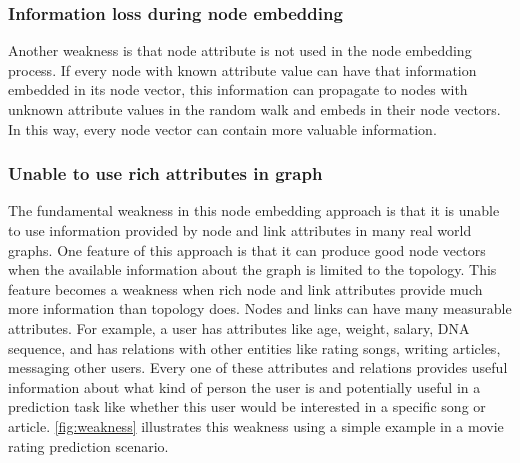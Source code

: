 \documentclass{article}
\begin{document}
\subsubsection{Information loss during node embedding}
Another weakness is that node attribute is not used in the node embedding process. If every node with known attribute value can have that information embedded in its node vector, this information can propagate to nodes with unknown attribute values in the random walk and embeds in their node vectors. In this way, every node vector can contain more valuable information.

\subsubsection{Unable to use rich attributes in graph}
The fundamental weakness in this node embedding approach is that it is unable to use information provided by node and link attributes in many real world graphs. One feature of this approach is that it can produce good node vectors when the available information about the graph is limited to the topology. This feature becomes a weakness when rich node and link attributes provide much more information than topology does. Nodes and links can have many measurable attributes. For example, a user has attributes like age, weight, salary, DNA sequence, and has relations with other entities like rating songs, writing articles, messaging other users. Every one of these attributes and relations provides useful information about what kind of person the user is and potentially useful in a prediction task like whether this user would be interested in a specific song or article. \autoref{fig:weakness} illustrates this weakness using a simple example in a movie rating prediction scenario.
\end{document}
